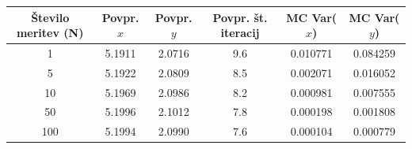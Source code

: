\begin{tabular}{|c|c|c|c|c|c|}\hline
\v{S}tevilo meritev (N) & Povpr. $x$ & Povpr. $y$ & Povpr. \v{s}t. iteracij & MC Var($x$) & MC Var($y$) \\\hline
1 & 5.1911 & 2.0716 & 9.6 & 0.010771 & 0.084259 \\
5 & 5.1922 & 2.0809 & 8.5 & 0.002071 & 0.016052 \\
10 & 5.1969 & 2.0986 & 8.2 & 0.000981 & 0.007555 \\
50 & 5.1996 & 2.1012 & 7.8 & 0.000198 & 0.001808 \\
100 & 5.1994 & 2.0990 & 7.6 & 0.000104 & 0.000779 \\
\hline\end{tabular}
